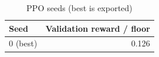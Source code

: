 \begin{table}[ht]
\centering
\small
\begin{tabular}{lr}
\toprule
Seed & Validation reward / floor \\
\midrule
0 (best) & 0.126 \\
\bottomrule
\end{tabular}
\caption{PPO seeds (best is exported)}
\label{tab:ppo_seeds}
\end{table}
